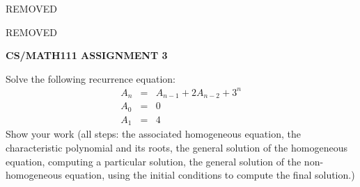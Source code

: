 \documentclass{article}
\begin{document}
\centerline{REMOVED}
\centerline{REMOVED}
\centerline{\large \bf CS/MATH111 ASSIGNMENT 3}

\vskip 0.2in


\vskip 0.2in


\begin{problem}
Solve the following recurrence equation:
%
\begin{eqnarray*}
        A_n &=& A_{n-1} + 2A_{n-2} + 3^n\\
        A_0 &=& 0 \\
        A_1 &=& 4
\end{eqnarray*}
%
Show your work (all steps: the associated homogeneous equation,
the characteristic polynomial and its
roots, the general solution of the homogeneous
equation, computing a particular solution,
the general solution of the non-homogeneous equation,
using the initial conditions to compute the final solution.)
\end{problem}
\newline
\end{document}
